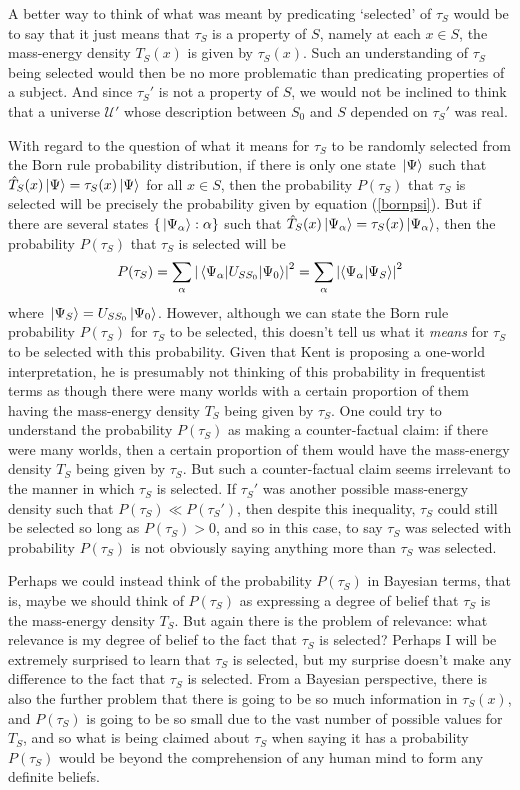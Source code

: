A better way to think of what was meant by predicating `selected' of $\tau_S$ would be to say that it just means that $\tau_S$ is a property of $S$, namely at each $x\in S$, the mass-energy density $T_S(x)$ is given by $\tau_S(x)$. Such an understanding of $\tau_S$ being selected would then be no more problematic than predicating properties of a subject. And since $\tau_S'$ is not a property of $S$, we would not be inclined to think that a universe $\mathcal{U}'$  whose description between $S_0$ and $S$ depended on $\tau_S'$ was real. 

With regard to the question of what it means for $\tau_S$ to be randomly selected from the Born rule probability distribution, if there is only one state $\ket*{\Psi}$ such that $\hat{T}_S(x)\ket*{\Psi}=\tau_S(x)\ket*{\Psi}$ for all $x\in S$, then the probability $P(\tau_S)$ that $\tau_S$ is selected will be precisely the probability given by equation (\ref{bornpsi}). But if there are several states $\{\ket*{\Psi_\alpha}:\alpha\}$ such that  $\hat{T}_S(x)\ket*{\Psi_\alpha}=\tau_S(x)\ket*{\Psi_\alpha}$, then the probability $P(\tau_S)$ that $\tau_S$ is selected will be 
$$P(\tau_S)=\sum_\alpha \abs{\mel{\Psi_\alpha}{U_{SS_0}}{\Psi_0}}^2=\sum_\alpha \abs{\ip{\Psi_\alpha}{\Psi_S}}^2$$ 
where $\ket*{\Psi_S}=U_{SS_0}\ket*{\Psi_0}$. However, although we can state the Born rule probability $P(\tau_S)$ for $\tau_S$ to be selected, this doesn't tell us what it \emph{means} for $\tau_S$ to be selected with this probability. Given that Kent is proposing a one-world interpretation, he is presumably not thinking of this probability in frequentist terms as though there were many worlds with a certain proportion of them having the mass-energy density $T_S$ being given by $\tau_S$. One could try to understand the probability $P(\tau_S)$ as making a counter-factual claim: if there were many worlds, then a certain proportion of them would have the mass-energy density $T_S$ being given by $\tau_S$. But such a counter-factual claim seems irrelevant to the manner in which $\tau_S$ is selected. If $\tau_S'$ was another possible mass-energy density such that $P(\tau_S)\ll P(\tau_S')$,  then despite this inequality, $\tau_S$ could still be selected so long as $P(\tau_S)>0$, and so in this case, to say $\tau_S$ was selected with probability $P(\tau_S)$ is not obviously saying anything more than  $\tau_S$ was selected.

Perhaps we could instead think of the probability $P(\tau_S)$ in Bayesian terms, that is, maybe we should think of $P(\tau_S)$ as expressing a degree of belief that $\tau_S$ is the mass-energy density $T_S$. But again there is the problem of relevance: what relevance is my degree of belief to the fact that $\tau_S$ is selected? Perhaps I will be extremely surprised to learn that $\tau_S$ is selected, but my surprise doesn't make any difference to the fact that $\tau_S$ is selected. From a Bayesian perspective, there is also the further problem that there is going to be so much information in $\tau_S(x)$, and $P(\tau_S)$ is going to be so small due to the vast number of possible values for $T_S$, and so what is being claimed about $\tau_S$ when saying it has a probability $P(\tau_S)$ would be beyond the comprehension of any human mind to form any definite beliefs. 

